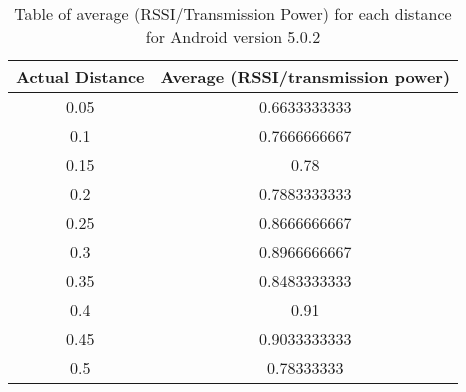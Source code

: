 \begin{table}[H]
\begin{tabular}{|c|c|}
\hline 
Actual Distance & Average (RSSI/transmission power)\tabularnewline
\hline 
\hline 
0.05 & 0.6633333333\tabularnewline
\hline 
0.1 & 0.7666666667\tabularnewline
\hline 
0.15 & 0.78\tabularnewline
\hline 
0.2 & 0.7883333333\tabularnewline
\hline 
0.25 & 0.8666666667\tabularnewline
\hline 
0.3 & 0.8966666667\tabularnewline
\hline 
0.35 &  0.8483333333\tabularnewline
\hline 
0.4 & 0.91\tabularnewline
\hline 
0.45 & 0.9033333333\tabularnewline
\hline 
0.5 & 0.78333333\tabularnewline
\hline 
\end{tabular}

\protect\caption{Table of average (RSSI/Transmission Power) for each distance for Android version 5.0.2}
\label{tableOfRssiNewAndroid}
\end{table}